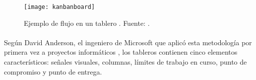 \documentclass{subfiles}
\begin{document}
        \begin{figure}
        \centering
        \texttt{[image: kanbanboard]}
        \caption{Ejemplo de flujo en un tablero \Kanban. Fuente: .}
        \label{fig:kanbanboard}
        \end{figure}

        \paragraph{}
        {Según David Anderson, el ingeniero de Microsoft que aplicó esta metodología por primera vez a proyectos informáticos \cite{book:anderson_david_kanban}, los tableros \Kanban contienen cinco elementos característicos: señales visuales, columnas, límites de trabajo en curso, punto de compromiso y punto de entrega.}
\end{document}
